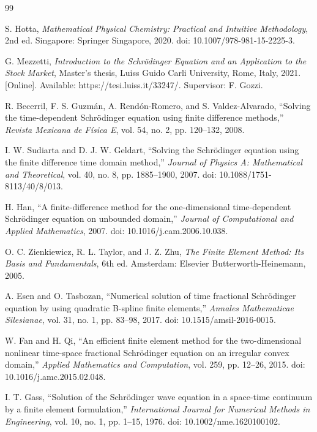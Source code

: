 \documentclass[11pt]{article}
\begin{document}
\begin{thebibliography}{99}
	
	S. Hotta, \emph{Mathematical Physical Chemistry: Practical and Intuitive Methodology}, 2nd ed. Singapore: Springer Singapore, 2020. doi: 10.1007/978-981-15-2225-3.
	
	G. Mezzetti, \emph{Introduction to the Schr\"odinger Equation and an Application to the Stock Market}, Master's thesis, Luiss Guido Carli University, Rome, Italy, 2021. [Online]. Available: https://tesi.luiss.it/33247/. Supervisor: F. Gozzi.
	
	R. Becerril, F. S. Guzm\'an, A. Rend\'on-Romero, and S. Valdez-Alvarado,  
	“Solving the time-dependent Schr\"odinger equation using finite difference methods,”  
	\emph{Revista Mexicana de F\'isica E}, vol. 54, no. 2, pp. 120--132, 2008.
	
	I. W. Sudiarta and D. J. W. Geldart,  
	“Solving the Schr\"odinger equation using the finite difference time domain method,”  
	\emph{Journal of Physics A: Mathematical and Theoretical}, vol. 40, no. 8, pp. 1885--1900, 2007. doi: 10.1088/1751-8113/40/8/013.
	
	H. Han,  
	“A finite-difference method for the one-dimensional time-dependent Schr\"odinger equation on unbounded domain,”  
	\emph{Journal of Computational and Applied Mathematics}, 2007. doi: 10.1016/j.cam.2006.10.038.
	
	O. C. Zienkiewicz, R. L. Taylor, and J. Z. Zhu,  
	\emph{The Finite Element Method: Its Basis and Fundamentals}, 6th ed. Amsterdam: Elsevier Butterworth-Heinemann, 2005.
	
	A. Esen and O. Tasbozan,  
	“Numerical solution of time fractional Schr\"odinger equation by using quadratic B-spline finite elements,”  
	\emph{Annales Mathematicae Silesianae}, vol. 31, no. 1, pp. 83--98, 2017. doi: 10.1515/amsil-2016-0015.
	
	W. Fan and H. Qi,  
	“An efficient finite element method for the two-dimensional nonlinear time-space fractional Schr\"odinger equation on an irregular convex domain,”  
	\emph{Applied Mathematics and Computation}, vol. 259, pp. 12--26, 2015. doi: 10.1016/j.amc.2015.02.048.
	
	I. T. Gass,  
	“Solution of the Schr\"odinger wave equation in a space-time continuum by a finite element formulation,”  
	\emph{International Journal for Numerical Methods in Engineering}, vol. 10, no. 1, pp. 1--15, 1976. doi: 10.1002/nme.1620100102.
	
\end{thebibliography}
\end{document}
